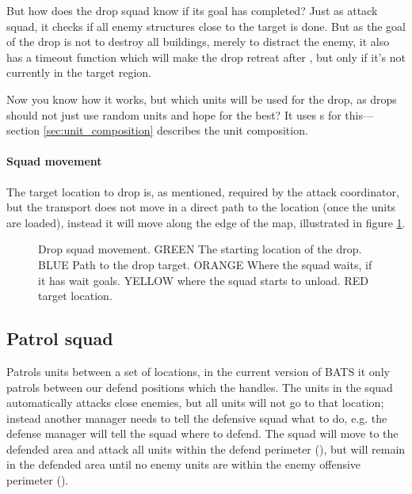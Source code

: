 But how does the drop squad know if its goal has completed? Just as attack squad, it checks if all enemy structures close to the target is done. But as the goal of the drop is not to destroy all buildings, merely to distract the enemy, it also has a timeout function which will make the drop retreat after \squadDropAttackTimeout, but only if it's not currently in the target region.

Now you know how it works, but which units will be used for the drop, as drops should not just use random units and hope for the best? It uses s for this—section \ref{sec:unit_composition} describes the unit composition. 


\paragraph{Squad movement}
The target location to drop is, as mentioned, required by the attack coordinator, but the transport does not move in a direct path to the location (once the units are loaded), instead it will move along the edge of the map, illustrated in figure \ref{fig:drop_squad_movement}.
\begin{figure}[htb]
\caption[Drop squad movement]{Drop squad movement. GREEN The starting location of the drop. BLUE Path to the drop target. ORANGE Where the squad waits, if it has wait goals. YELLOW where the squad starts to unload. RED target location.}
\label{fig:drop_squad_movement}
\end{figure}

\subsection{Patrol squad}
\label{sec:patrol_squad}
Patrols units between a set of locations, in the current version of BATS it only patrols between our defend positions which the  handles. The units in the squad automatically attacks close enemies, but all units will not go to that location; instead another manager needs to tell the defensive squad what to do, e.g. the defense manager will tell the squad where to defend. The squad will move to the defended area and attack all units within the defend perimeter (\squadDefendDefendPerimeter), but will remain in the defended area until no enemy units are within the enemy offensive perimeter (\squadDefendEnemyOffensivePerimeter).

